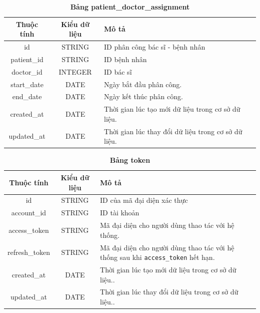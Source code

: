 \begin{table}[H]
  \caption{\bfseries \fontsize{12pt}{0pt}\selectfont Bảng patient\_doctor\_assignment}
  \centering
  \begin{tabularx}{\textwidth}{|c|c|X|}
    \hline
    \textbf{Thuộc tính} & \textbf{Kiểu dữ liệu} & \textbf{Mô tả} \\
    \hline
    id & STRING & ID phân công bác sĩ - bệnh nhân  \\
    \hline
    patient\_id & STRING & ID bệnh nhân  \\
    \hline
    doctor\_id & INTEGER & ID bác sĩ  \\
    \hline
    start\_date & DATE & Ngày bắt đầu phân công. \\
    \hline
    end\_date & DATE & Ngày kết thúc phân công. \\
    \hline
    created\_at & DATE & Thời gian lúc tạo mới dữ liệu trong cơ sở dữ liệu. \\
    \hline
    updated\_at & DATE & Thời gian lúc thay đổi dữ liệu trong cơ sở dữ liệu. \\
    \hline
  \end{tabularx}
\end{table}

\begin{table}[H]
  \caption{\bfseries \fontsize{12pt}{0pt}\selectfont Bảng token}
  \centering
  \begin{tabularx}{\textwidth}{|c|c|X|}
    \hline
    \textbf{Thuộc tính} & \textbf{Kiểu dữ liệu} & \textbf{Mô tả} \\
    \hline
    id & STRING & ID của mã đại diện xác thực  \\
    \hline
    account\_id & STRING & ID tài khoản  \\
    \hline
    access\_token & STRING & Mã đại diện cho người dùng thao tác với hệ thống. \\
    \hline
    refresh\_token & STRING & Mã đại diện cho người dùng thao tác với hệ thống sau khi \texttt{access\_token} hết hạn. \\
    \hline
    created\_at & DATE & Thời gian lúc tạo mới dữ liệu trong cơ sở dữ liệu.. \\
    \hline
    updated\_at & DATE & Thời gian lúc thay đổi dữ liệu trong cơ sở dữ liệu.. \\
    \hline
  \end{tabularx}
\end{table}




